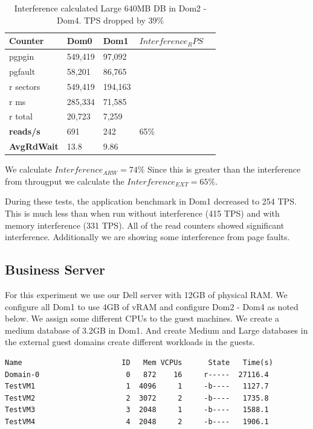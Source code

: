 \begin{table}[h]
\begin{tabular}{ l l l l p{5cm} }
  Counter     & Dom0    & Dom1    & $Interference_RPS$ \\
  \hline
	pgpgin    & 549,419 & 97,092 &  \\
	pgfault   &  58,201 & 86,765 &  \\
	r sectors & 549,419 &194,163 &  \\
	r ms      & 285,334 & 71,585 &  \\
	r total   &  20,723 &  7,259 &  \\
    \textbf{reads/s}    & 691 & 242 &   65\% \\
    \textbf{AvgRdWait}  & 13.8 & 9.86 &  \\ 
  \hline
\end{tabular}
\caption{Interference calculated Large 640MB DB in Dom2 - Dom4.  TPS dropped by 39\%}
\label{fig:InterferenceLg}
\end{table}
We calculate $Interference_{ARW} = 74\%$  Since this is greater than the interference from througput we calculate the $Interference_{EXT} = 65\%$.

During these tests, the application benchmark in Dom1 decreased to 254 TPS.  This is much less than when run without interference (415 TPS) and with memory interference (331 TPS).  All of the read counters showed significant interference.  Additionally we are showing some interference from page faults.  

\subsection{Business Server}
For this experiment we use our Dell server with 12GB of physical RAM. We configure all Dom1 to use 4GB of vRAM and configure Dom2 - Dom4 as noted below.  We assign some different CPUs to the guest machines. We create a medium database of 3.2GB in Dom1.   And create Medium and Large databases in the external guest domains create different workloads in the guests.

\begin{Verbatim}
Name                       ID   Mem VCPUs      State   Time(s)
Domain-0                    0   872    16     r-----  27116.4
TestVM1                     1  4096     1     -b----   1127.7
TestVM2                     2  3072     2     -b----   1735.8
TestVM3                     3  2048     1     -b----   1588.1
TestVM4                     4  2048     2     -b----   1906.1
\end{Verbatim}

